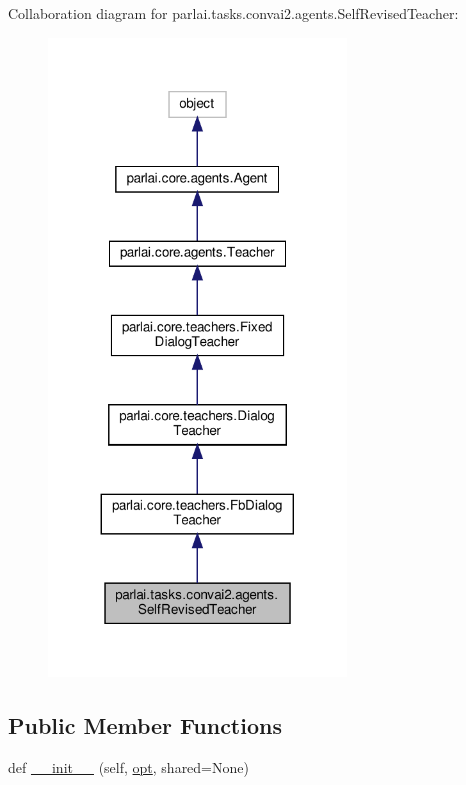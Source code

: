 Collaboration diagram for parlai.\+tasks.\+convai2.\+agents.\+Self\+Revised\+Teacher\+:
\nopagebreak
\begin{figure}[H]
\begin{center}
\leavevmode
\includegraphics[width=224pt]{d0/d24/classparlai_1_1tasks_1_1convai2_1_1agents_1_1SelfRevisedTeacher__coll__graph}
\end{center}
\end{figure}
\subsection*{Public Member Functions}
\begin{DoxyCompactItemize}
\item 
def \hyperlink{classparlai_1_1tasks_1_1convai2_1_1agents_1_1SelfRevisedTeacher_a7e0e99704aa5772d371e1b03dfe5cf5a}{\+\_\+\+\_\+init\+\_\+\+\_\+} (self, \hyperlink{classparlai_1_1core_1_1teachers_1_1FbDialogTeacher_af7a9ec497b9cd0292d7b8fa220da7c28}{opt}, shared=None)
\end{DoxyCompactItemize}
